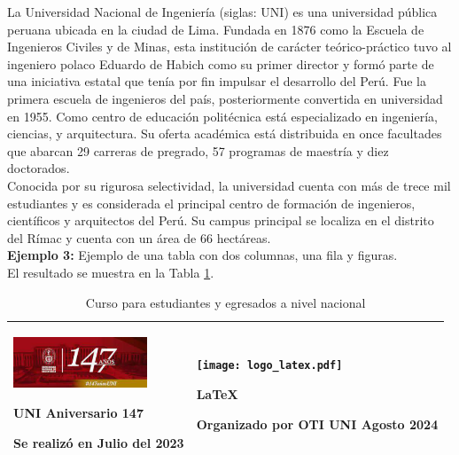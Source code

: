 \documentclass{article}
\begin{document}
La Universidad Nacional de Ingeniería (siglas: UNI) es una universidad pública peruana ubicada en la ciudad de Lima. Fundada en 1876 como la Escuela de Ingenieros Civiles y de Minas, esta institución de carácter teórico-práctico tuvo al ingeniero polaco Eduardo de Habich como su primer director y formó parte de una iniciativa estatal que tenía por fin impulsar el desarrollo del Perú. Fue la primera escuela de ingenieros del país, posteriormente convertida en universidad en 1955. Como centro de educación politécnica está especializado en ingeniería, ciencias, y arquitectura. Su oferta académica está distribuida en once facultades que abarcan 29 carreras de pregrado, 57 programas de maestría y diez doctorados. \\

Conocida por su rigurosa selectividad, la universidad cuenta con más de trece mil estudiantes y es considerada el principal centro de formación de ingenieros, científicos y arquitectos del Perú. Su campus principal se localiza en el distrito del Rímac y cuenta con un área de 66 hectáreas.\\

\textbf{Ejemplo 3:} Ejemplo de una tabla con dos columnas, una fila y figuras. \\

El resultado se muestra en la Tabla \ref{Tabla_001}.
\begin{table}[h]
    \centering
    \begin{tabular}{|p{5cm}|p{5cm}|} \hline
       \begin{center}
            \includegraphics[width=4cm]{UNI_logo_147.pdf}
            \par \textbf{UNI Aniversario 147}
            \par Se realizó en Julio del 2023
       \end{center} 
       &   %
       \begin{center}
           \texttt{[image: logo\_latex.pdf]}
           \par \textbf{\LaTeX}
           \par Organizado por OTI UNI Agosto 2024
       \end{center}
       \\ \hline
    \end{tabular}
    \caption{Curso para estudiantes y egresados a nivel nacional}
    \label{Tabla_001}
\end{table}
\end{document}
